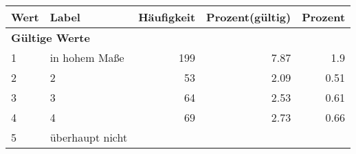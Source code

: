      \begin{longtable}{lXrrr}
     \toprule
     \textbf{Wert} & \textbf{Label} & \textbf{Häufigkeit} & \textbf{Prozent(gültig)} & \textbf{Prozent} \\
     \endhead
     \midrule
     \multicolumn{5}{l}{\textbf{Gültige Werte}}\\

     1 &
     \multicolumn{1}{X}{ in hohem Maße   } &


       \num{199} &
       \num[round-mode=places,round-precision=2]{7.87} &
         \num[round-mode=places,round-precision=2]{1.9} \\

     2 &
     \multicolumn{1}{X}{ 2   } &


       \num{53} &
       \num[round-mode=places,round-precision=2]{2.09} &
         \num[round-mode=places,round-precision=2]{0.51} \\

     3 &
     \multicolumn{1}{X}{ 3   } &


       \num{64} &
       \num[round-mode=places,round-precision=2]{2.53} &
         \num[round-mode=places,round-precision=2]{0.61} \\

     4 &
     \multicolumn{1}{X}{ 4   } &


       \num{69} &
       \num[round-mode=places,round-precision=2]{2.73} &
         \num[round-mode=places,round-precision=2]{0.66} \\

     5 &
     \multicolumn{1}{X}{ überhaupt nicht   } &



\end{longtable}
